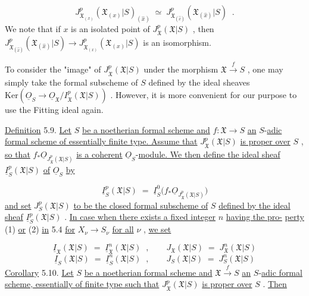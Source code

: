 \begin{equation*}
J^{p}_{\mathfrak{X}_{(x)}}(\mathfrak{X}_{(x)}|S)_{(\hat{x})} \;\simeq\; J^{p}_{\mathfrak{X}_{(\hat{x})}}(\mathfrak{X}_{(\hat{x})}|S) \;\;.
\end{equation*}
We note that if $x$ is an isolated point of $J^{p}_{\mathfrak{X}}(\mathfrak{X}|S)$ , then $J^{p}_{\mathfrak{X}_{(\hat{x})}}(\mathfrak{X}_{(\hat{x})}|S) \to J^{p}_{\mathfrak{X}_{(x)}}(\mathfrak{X}_{(x)}|S)$ is an isomorphism.

To consider the "image" of $J^{p}_{\mathfrak{X}}(\mathfrak{X}|S)$ under the morphism $\mathfrak{X} \xrightarrow{\,f\,} S$ , one may simply take the formal subscheme of $S$ defined by the ideal sheaves $\mathrm{Ker}(\underline{O}_S \to \underline{O}_{\mathfrak{X}}/I^{p}_{\mathfrak{X}}(\mathfrak{X}|S))$ . However, it is more convenient for our purpose to use the Fitting ideal again.

\underline{Definition} 5.9. \underline{Let} $S$ \underline{be a noetherian formal scheme and} $f : \mathfrak{X} \to S$ \underline{an} $S$-\underline{adic formal scheme of essentially finite type. Assume that} $J^{p}_{\mathfrak{X}}(\mathfrak{X}|S)$ \underline{is proper over} $S$ , \underline{so that} $f_{*}\underline{O}_{J^{p}_{\mathfrak{X}}(\mathfrak{X}|S)}$ \underline{is a coherent} $\underline{O}_S$-\underline{module. We then define the ideal sheaf} $\underline{I}^{p}_{S}(\mathfrak{X}|S)$ \underline{of} $\underline{O}_S$ \underline{by}

\begin{equation*}
\underline{I}^{p}_{S}(\mathfrak{X}|S) \;=\; \underline{I}^{0}_{S}\big(f_{*}\underline{O}_{J^{p}_{\mathfrak{X}}(\mathfrak{X}|S)}\big)
\end{equation*}
\underline{and set} $J^{p}_{S}(\mathfrak{X}|S)$ \underline{to be the closed formal subscheme of} $S$ \underline{defined by the ideal sheaf} $\underline{I}^{p}_{S}(\mathfrak{X}|S)$ . \underline{In case when there exists a fixed integer} $n$ \underline{having the pro-}
\underline{perty} (1) \underline{or} (2) \underline{in} 5.4 \underline{for} $X_\nu \to S_\nu$ \underline{for all} $\nu$ , \underline{we set}

\begin{equation*}
\underline{I}_{\mathfrak{X}}(\mathfrak{X}|S) \;=\; \underline{I}^{n}_{\mathfrak{X}}(\mathfrak{X}|S) \;\;,\qquad J_{\mathfrak{X}}(\mathfrak{X}|S) \;=\; J^{n}_{\mathfrak{X}}(\mathfrak{X}|S)
\end{equation*}
\begin{equation*}
\underline{I}_{S}(\mathfrak{X}|S) \;=\; \underline{I}^{n}_{S}(\mathfrak{X}|S) \;\;,\qquad J_{S}(\mathfrak{X}|S) \;=\; J^{n}_{S}(\mathfrak{X}|S)
\end{equation*}
\underline{Corollary} 5.10. \underline{Let} $S$ \underline{be a noetherian formal scheme and} $\mathfrak{X} \xrightarrow{\,f\,} S$ \underline{an} $S$-\underline{adic formal scheme, essentially of finite type such that} $J^{p}_{\mathfrak{X}}(\mathfrak{X}|S)$ \underline{is proper over} $S$ . \underline{Then}

